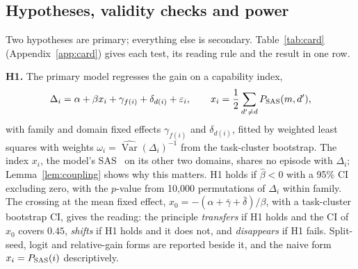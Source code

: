 \subsection{Hypotheses, validity checks and power}
\label{sec:hypotheses}

Two hypotheses are primary; everything else is secondary. Table~\ref{tab:card} (Appendix~\ref{app:card}) gives each test, its reading rule and the result in one row.

\textbf{H1.} The primary model regresses the gain on a capability index,
\begin{equation}
\label{eq:h1}
\Delta_i=\alpha+\beta x_i+\gamma_{f(i)}+\delta_{d(i)}+\varepsilon_i,\qquad x_i=\frac{1}{2}\sum_{d'\neq d}P_{\text{\textup{SAS}}}(m,d'),
\end{equation}
with family and domain fixed effects $\gamma_{f(i)}$ and $\delta_{d(i)}$, fitted by weighted least squares with weights $\omega_i=\widehat{\operatorname{Var}}(\Delta_i)^{-1}$ from the task-cluster bootstrap. The index $x_i$, the model's SAS \passone\ on its other two domains, shares no episode with $\Delta_i$; Lemma~\ref{lem:coupling} shows why this matters. H1 holds if $\hat\beta<0$ with a 95\% CI excluding zero, with the $p$-value from 10,000 permutations of $\Delta_i$ within family. The crossing at the mean fixed effect, $x_0=-(\alpha+\bar\gamma+\bar\delta)/\beta$, with a task-cluster bootstrap CI, gives the reading: the principle \emph{transfers} if H1 holds and the CI of $x_0$ covers $0.45$, \emph{shifts} if H1 holds and it does not, and \emph{disappears} if H1 fails. Split-seed, logit and relative-gain forms are reported beside it, and the naive form $x_i=P_{\text{\textup{SAS}}}(i)$ descriptively.


